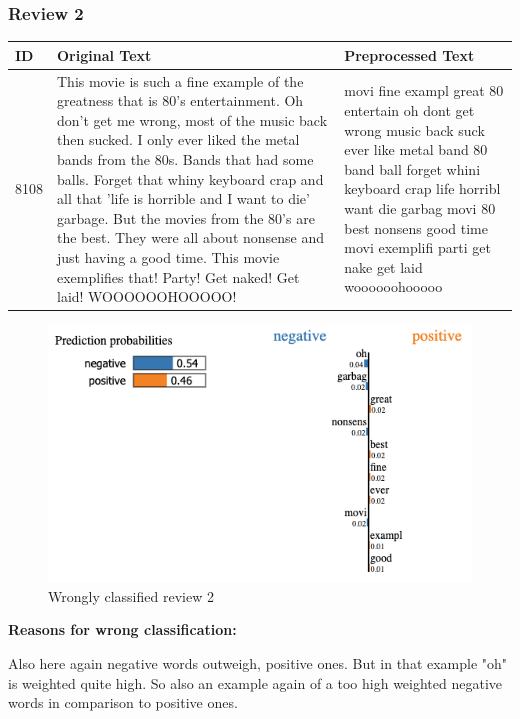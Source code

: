 \newpage
\subsubsection{Review 2}
\begin{tabularx}{\textwidth}{l|X|X}
\textbf{ID} & \textbf{Original Text} & \textbf{Preprocessed Text}\\
\hline
8108 &
This movie is such a fine example of the greatness that is 80's entertainment. Oh don't get me wrong, most of the music back then sucked. I only ever liked the metal bands from the 80s. Bands that had some balls. Forget that whiny keyboard crap and all that 'life is horrible and I want to die' garbage. But the movies from the 80's are the best. They were all about nonsense and just having a good time. This movie exemplifies that! Party! Get naked! Get laid! WOOOOOOHOOOOO!
&
movi fine exampl great 80 entertain oh dont get wrong music back suck ever like metal band 80 band ball forget whini keyboard crap life horribl want die garbag movi 80 best nonsens good time movi exemplifi parti get nake get laid woooooohooooo
\end{tabularx}

\begin{figure}[htb!]
	\includegraphics[width=\textwidth]{img/review_2}
	\caption{Wrongly classified review 2}
\end{figure}

\textbf{Reasons for wrong classification:}

Also here again negative words outweigh, positive ones. But in that example "oh" is weighted quite high.
So also an example again of a too high weighted negative words in comparison to positive ones.